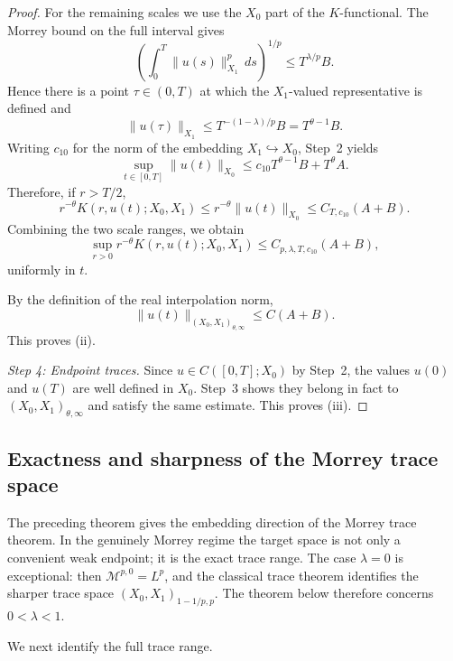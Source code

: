 \documentclass[smallextended,envcountsect,envcountsame]{svjour3}
\begin{document}
\begin{proof}
		For the remaining scales we use the $X_0$ part of the $K$-functional.  The Morrey bound on the full interval gives
		\[
		\left(\int_0^T\|u(s)\|_{X_1}^p\,ds\right)^{1/p}
		\le T^{\lambda/p}B.
		\]
		Hence there is a point $\tau\in(0,T)$ at which the $X_1$-valued representative is defined and
		\[
		\|u(\tau)\|_{X_1}
		\le T^{-(1-\lambda)/p}B
		=T^{\theta-1}B.
		\]
		Writing $c_{10}$ for the norm of the embedding $X_1\hookrightarrow X_0$, Step~2 yields
		\[
		\sup_{t\in[0,T]}\|u(t)\|_{X_0}
		\le c_{10}T^{\theta-1}B+T^\theta A.
		\]
		Therefore, if $r>T/2$,
		\[
		r^{-\theta}K(r,u(t);X_0,X_1)
		\le r^{-\theta}\|u(t)\|_{X_0}
		\le C_{T,c_{10}}(A+B).
		\]
		Combining the two scale ranges, we obtain
		\[
		\sup_{r>0}r^{-\theta}K(r,u(t);X_0,X_1)
		\le C_{p,\lambda,T,c_{10}}(A+B),
		\]
		uniformly in $t$.
		
		By the definition of the real interpolation norm,
		\[
		\|u(t)\|_{(X_0,X_1)_{\theta,\infty}}
		\le
		C(A+B).
		\]
		This proves \textup{(ii)}.
		
		\medskip
		\noindent
		\textit{Step 4: Endpoint traces.}
		Since $u\in C([0,T];X_0)$ by Step~2, the values $u(0)$ and $u(T)$ are well defined in $X_0$. Step~3 shows they belong in fact to $(X_0,X_1)_{\theta,\infty}$ and satisfy the same estimate. This proves \textup{(iii)}.
	\end{proof}
	
	\subsection{Exactness and sharpness of the Morrey trace space}\label{subsec:morrey-trace-sharpness}

	The preceding theorem gives the embedding direction of the Morrey trace theorem.  In the genuinely Morrey regime the target space is not only a convenient weak endpoint; it is the exact trace range.  The case \(\lambda=0\) is exceptional: then \(\mathcal M^{p,0}=L^p\), and the classical trace theorem identifies the sharper trace space \((X_0,X_1)_{1-1/p,p}\).  The theorem below therefore concerns \(0<\lambda<1\).

	We next identify the full trace range.
\end{document}

